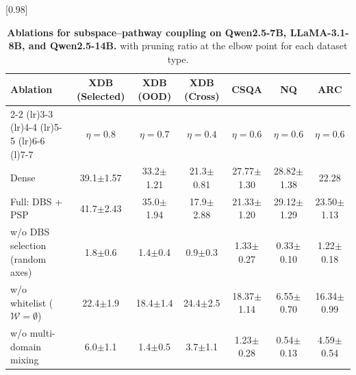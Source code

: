 \begin{table}[!t]
\caption{\textbf{Ablations for subspace--pathway coupling on Qwen2.5-7B, LLaMA-3.1-8B, and Qwen2.5-14B.}
with pruning ratio at the elbow point for each dataset type.}
\vspace{-2mm}
\centering
\footnotesize
\setlength{\tabcolsep}{3.6pt}
\renewcommand{\arraystretch}{1.05}
[0.98\textwidth]{
\begin{tabular}{l c c c c c c}
\toprule
\textbf{Ablation} &
\textbf{XDB (Selected)} &
\textbf{XDB (OOD)} &
\textbf{XDB (Cross)} &
\textbf{CSQA} &
\textbf{NQ} &
\textbf{ARC} \\
\cmidrule(lr){2-2} \cmidrule(lr){3-3} \cmidrule(lr){4-4} \cmidrule(lr){5-5} \cmidrule(lr){6-6} \cmidrule(l){7-7}
\rowcolor{lightgray} & $\eta\!=\!0.8$ & $\eta\!=\!0.7$ & $\eta\!=\!0.4$ & $\eta\!=\!0.6$ & $\eta\!=\!0.6$ & $\eta\!=\!0.6$ \\
\midrule
Dense & 39.1{\scriptsize$\pm$1.57} & 33.2{\scriptsize$\pm$1.21} & 21.3{\scriptsize$\pm$0.81} & 27.77{\scriptsize$\pm$1.30} & 28.82{\scriptsize$\pm$1.38} & 22.28 \\
\addlinespace[0.5pt]
Full: DBS + PSP & 41.7{\scriptsize$\pm$2.43} & 35.0{\scriptsize$\pm$1.94} & 17.9{\scriptsize$\pm$2.88} & 21.33{\scriptsize$\pm$1.20} & 29.12{\scriptsize$\pm$1.29} & 23.50{\scriptsize$\pm$1.13} \\
\addlinespace[0.5pt]
w/o DBS selection (random axes) & 1.8{\scriptsize$\pm$0.6} & 1.4{\scriptsize$\pm$0.4} & 0.9{\scriptsize$\pm$0.3} & 1.33{\scriptsize$\pm$0.27} & 0.33{\scriptsize$\pm$0.10} & 1.22{\scriptsize$\pm$0.18} \\
w/o whitelist ($\mathcal{W}\!=\!\emptyset$) & 22.4{\scriptsize$\pm$1.9} & 18.4{\scriptsize$\pm$1.4} & 24.4{\scriptsize$\pm$2.5} & 18.37{\scriptsize$\pm$1.14} & 6.55{\scriptsize$\pm$0.70} & 16.34{\scriptsize$\pm$0.99} \\
w/o multi-domain mixing & 6.0{\scriptsize$\pm$1.1} & 1.4{\scriptsize$\pm$0.5} & 3.7{\scriptsize$\pm$1.1} & 1.23{\scriptsize$\pm$0.28} & 0.54{\scriptsize$\pm$0.13} & 4.59{\scriptsize$\pm$0.54} \\
\bottomrule
\end{tabular}
} \\

\vspace{0.3cm}


\end{table}

